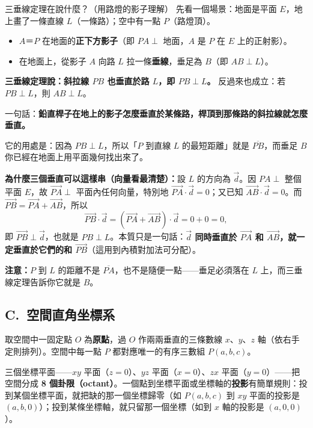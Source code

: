 \documentclass[11pt]{article}
\begin{document}
\begin{補充框}{三垂線定理在說什麼？（用路燈的影子理解）}
先看一個場景：地面是平面 $E$，地上畫了一條直線 $L$（一條路）；空中有一點 $P$（路燈頂）。
\begin{itemize}\setlength{\itemsep}{1pt}
\item $A$＝$P$ 在地面的\textbf{正下方影子}（即 $PA\perp$ 地面，$A$ 是 $P$ 在 $E$ 上的正射影）。
\item 在地面上，從影子 $A$ 向路 $L$ 拉一條\textbf{垂線}，垂足為 $B$（即 $AB\perp L$）。
\end{itemize}
\textbf{三垂線定理說：斜拉線 $PB$ 也垂直於路 $L$，即 $PB\perp L$。} 反過來也成立：若 $PB\perp L$，則 $AB\perp L$。

一句話：\textbf{鉛直桿子在地上的影子怎麼垂直於某條路，桿頂到那條路的斜拉線就怎麼垂直。}

它的用處是：因為 $PB\perp L$，所以「$P$ 到直線 $L$ 的最短距離」就是 $\overline{PB}$，而垂足 $B$ 你已經在地面上用平面幾何找出來了。

\textbf{為什麼三個垂直可以這樣串（向量看最清楚）：}設 $L$ 的方向為 $\vec d$。因 $PA\perp$ 整個平面 $E$，故 $\vec{PA}\perp$ 平面內任何向量，特別地 $\vec{PA}\cdot\vec d=0$；又已知 $\vec{AB}\cdot\vec d=0$。而 $\vec{PB}=\vec{PA}+\vec{AB}$，所以
$$\vec{PB}\cdot\vec d=(\vec{PA}+\vec{AB})\cdot\vec d=0+0=0,$$
即 $\vec{PB}\perp\vec d$，也就是 $PB\perp L$。本質只是一句話：\textbf{$\vec d$ 同時垂直於 $\vec{PA}$ 和 $\vec{AB}$，就一定垂直於它們的和 $\vec{PB}$}（這用到內積對加法可分配）。

\textbf{注意：}$P$ 到 $L$ 的距離不是 $\overline{PA}$，也不是隨便一點——垂足必須落在 $L$ 上，而三垂線定理告訴你它就是 $B$。
\end{補充框}


\subsection*{\sffamily C.\ 空間直角坐標系}

取空間中一固定點 $O$ 為\textbf{原點}，過 $O$ 作兩兩垂直的三條數線 $x$、$y$、$z$ 軸（依右手定則排列）。空間中每一點 $P$ 都對應唯一的有序三數組 $P(a,b,c)$。

三個坐標平面——$xy$ 平面（$z=0$）、$yz$ 平面（$x=0$）、$zx$ 平面（$y=0$）——把空間分成 \textbf{8 個卦限（octant）}。一個點到坐標平面或坐標軸的\textbf{投影}有簡單規則：投到某個坐標平面，就把缺的那一個坐標歸零（如 $P(a,b,c)$ 到 $xy$ 平面的投影是 $(a,b,0)$）；投到某條坐標軸，就只留那一個坐標（如到 $x$ 軸的投影是 $(a,0,0)$）。
\end{document}
